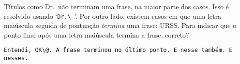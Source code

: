 Títulos como Dr.\ não terminam uma frase, na maior parte dos
casos. Isso é resolvido usando `\verb*'Dr.\ ''. 
Por outro lado, existem casos em que uma letra maiúscula seguida de
pontuação \emph{termina} uma frase: URSS\@. Para indicar que o ponto
final após uma letra maiúscula termina a frase, correto?
\begin{center}\footnotesize
\verb'Entendi, OK\@. A frase terminou no último ponto. E nesse também. E nesses.'
\end{center}

